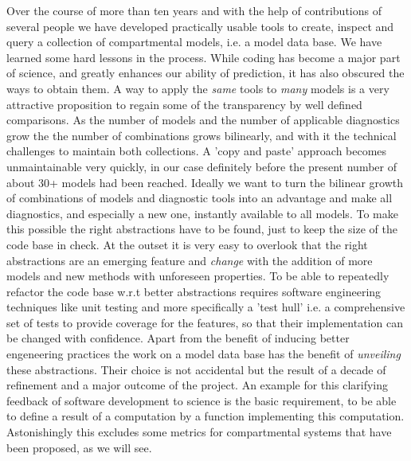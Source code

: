 Over the course of more than ten years and with the help of contributions of
several people we have developed  practically usable tools to create, inspect
and query a collection of compartmental models, i.e. a model data base.  We
have learned some hard lessons in the process.  While coding has become a major
part of science, and greatly enhances our ability of prediction, it has also
obscured the ways to obtain them.  A way to apply the \emph{same} tools to
\emph{many} models is a very attractive proposition to regain some of the
transparency by well defined comparisons.  As the number of models and the
number of applicable diagnostics grow the the number of combinations grows
bilinearly, and with it the technical challenges to maintain both collections.
A 'copy and paste' approach becomes unmaintainable very quickly, in our case
definitely before the present number of about 30+ models had been reached.
Ideally we want to turn the bilinear growth of combinations of models and
diagnostic tools into an advantage and make all diagnostics, and especially a new one, instantly
available to all models.  To make this possible the right abstractions have to be found, just to
keep the size of the code base in check.  At the outset it is very easy to
overlook that the right abstractions are an emerging feature and \emph{change}
with the addition of more models and new methods with unforeseen properties.  To
be able to repeatedly refactor the code base w.r.t better abstractions requires
software engineering techniques like unit testing and more specifically a 'test
hull' i.e. a comprehensive set of tests to provide coverage for the
features, so that their implementation can be changed with confidence.  Apart
from the benefit of inducing better engeneering practices the work on a model
data base has the benefit of \emph{unveiling} these abstractions.  Their choice
is not accidental but the result of a decade of refinement and a major outcome
of the project.  An example for this clarifying feedback of software
development to science is  the basic requirement, to be able to  define  a
result of a computation by a function implementing this computation.
Astonishingly this excludes some metrics for compartmental systems that have
been proposed, as we will see.

